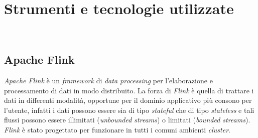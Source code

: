 
\chapter{Strumenti e tecnologie utilizzate}
\label{cap:strumenti-tecnologie}


\\

\section{Apache Flink}
\textit{Apache Flink} è un \textit{\textit{\gls{framework}}} di \textit{data processing} per l'elaborazione e processamento di dati in modo distribuito.
La forza di \textit{Flink} è quella di trattare i dati in differenti modalità, opportune per il dominio applicativo più consono per l'utente, infatti i dati possono essere sia di tipo \textit{\gls{stateful}} che di tipo \textit{\gls{stateless}} e tali flussi possono essere illimitati (\textit{\gls{unbounded streams}}) o limitati (\textit{\gls{bounded streams}}). \textit{Flink} è stato progettato per funzionare in tutti i comuni ambienti \textit{\gls{cluster}}.

